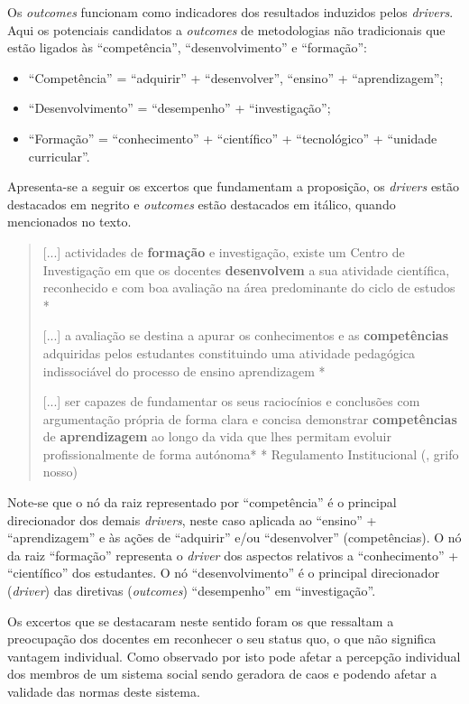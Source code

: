 \documentclass{textolivre}
\begin{document}
Os \textit{outcomes} funcionam como indicadores dos resultados induzidos pelos \textit{drivers}. Aqui os potenciais candidatos a \textit{outcomes} de metodologias não tradicionais que estão ligados às “competência”, “desenvolvimento” e “formação”:

\begin{itemize}
\item “Competência” = “adquirir” + “desenvolver”, “ensino” + “aprendizagem”;
\item “Desenvolvimento” = “desempenho” + “investigação”;
\item “Formação” = “conhecimento” + “científico” + “tecnológico” + “unidade curricular”.
\end{itemize}

Apresenta-se a seguir os excertos que fundamentam a proposição, os \textit{drivers} estão destacados em negrito e \textit{outcomes} estão destacados em itálico, quando mencionados no texto.

\begin{quote}
[...] actividades de \textbf{formação} e investigação, existe um Centro de Investigação em que os docentes \textbf{desenvolvem} a sua atividade científica, reconhecido e com boa avaliação na área predominante do ciclo de estudos *

[...] a avaliação se destina a apurar os conhecimentos e as \textbf{competências} adquiridas pelos estudantes constituindo uma atividade pedagógica indissociável do processo de ensino aprendizagem *

[...] ser capazes de fundamentar os seus raciocínios e conclusões com argumentação própria de forma clara e concisa demonstrar \textbf{competências} de \textbf{aprendizagem} ao longo da vida que lhes permitam evoluir profissionalmente de forma autónoma* 		
	* Regulamento Institucional (\cite{utad2018}, grifo nosso)
\end{quote}

Note-se que o nó da raiz representado por “competência” é o principal direcionador dos demais \textit{drivers}, neste caso aplicada ao “ensino” + “aprendizagem” e às ações de “adquirir” e/ou “desenvolver” (competências). O nó da raiz “formação” representa o \textit{driver} dos aspectos relativos a “conhecimento” + “científico” dos estudantes. O nó “desenvolvimento” é o principal direcionador (\textit{driver}) das diretivas (\textit{outcomes}) “desempenho” em “investigação”.

Os excertos que se destacaram neste sentido foram os que ressaltam a preocupação dos docentes em reconhecer o seu status quo, o que não significa vantagem individual. Como observado por \textcite{rogers1983} isto pode afetar a percepção individual dos membros de um sistema social sendo geradora de caos e podendo afetar a validade das normas deste sistema.
\end{document}
